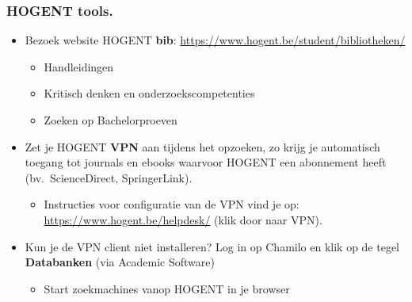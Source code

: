 \documentclass[aspectratio=169]{beamer}
\begin{document}
\begin{frame}
  \frametitle{HOGENT tools.}

  \begin{itemize}
    \item<+-> Bezoek website HOGENT \textbf{bib}: \url{https://www.hogent.be/student/bibliotheken/}
    \begin{itemize}
        \item Handleidingen
        \item Kritisch denken en onderzoekscompetenties
        \item Zoeken op Bachelorproeven
    \end{itemize}
    \item<+-> Zet je HOGENT \textbf{VPN} aan tijdens het opzoeken, zo krijg je automatisch toegang tot journals en ebooks waarvoor HOGENT een abonnement heeft (bv.~ScienceDirect, SpringerLink). 
    \begin{itemize}
        \item Instructies voor configuratie van de VPN vind je op: \url{https://www.hogent.be/helpdesk/} (klik door naar VPN).
    \end{itemize}
    \item<+-> Kun je de VPN client niet installeren? Log in op Chamilo en klik op de tegel \textbf{Databanken} (via Academic Software)
    \begin{itemize}
        \item Start zoekmachines vanop HOGENT in je browser
    \end{itemize}
    
  \end{itemize}
\end{frame}
\end{document}
